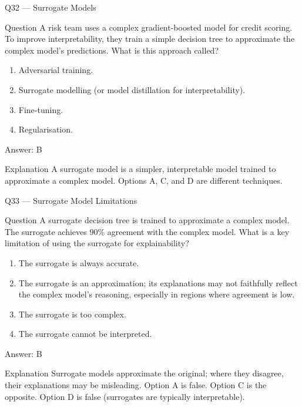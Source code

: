 \documentclass[aspectratio=169,8pt]{beamer}
\begin{document}
	\begin{frame}{Q32 --- Surrogate Models}
		\begin{block}{Question}
			A risk team uses a complex gradient-boosted model for credit scoring. To improve interpretability, they train a simple decision tree to approximate the complex model's predictions. What is this approach called?
			\begin{enumerate}
				\item Adversarial training.
				\item Surrogate modelling (or model distillation for interpretability).
				\item Fine-tuning.
				\item Regularisation.
			\end{enumerate}
		\end{block}
		\begin{exampleblock}{Answer: B}\end{exampleblock}
		\begin{block}{Explanation}
			A surrogate model is a simpler, interpretable model trained to approximate a complex model. Options A, C, and D are different techniques.
		\end{block}
	\end{frame}
	
	\begin{frame}{Q33 --- Surrogate Model Limitations}
		\begin{block}{Question}
			A surrogate decision tree is trained to approximate a complex model. The surrogate achieves 90\% agreement with the complex model. What is a key limitation of using the surrogate for explainability?
			\begin{enumerate}
				\item The surrogate is always accurate.
				\item The surrogate is an approximation; its explanations may not faithfully reflect the complex model's reasoning, especially in regions where agreement is low.
				\item The surrogate is too complex.
				\item The surrogate cannot be interpreted.
			\end{enumerate}
		\end{block}
		\begin{exampleblock}{Answer: B}\end{exampleblock}
		\begin{block}{Explanation}
			Surrogate models approximate the original; where they disagree, their explanations may be misleading. Option A is false. Option C is the opposite. Option D is false (surrogates are typically interpretable).
		\end{block}
	\end{frame}
	
\end{document}

